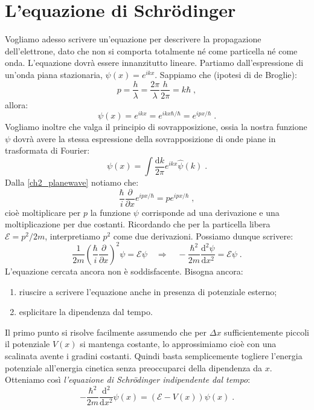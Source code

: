 \documentclass[10pt,a4paper]{report}
\theoremstyle{definition}
\newcommand{\dev}[3][]{\frac{\mathrm{d}^{#1} #2}{\mathrm{d} #3^{#1}}}
\numberwithin{equation}{section}
\newcommand{\diff}[1][]{\mathrm{d}#1}
\begin{document}
\section{L'equazione di Schrödinger}
Vogliamo adesso scrivere un'equazione per descrivere la propagazione dell'elettrone, dato che non si comporta totalmente né come particella né come onda. L'equazione dovrà essere innanzitutto lineare. Partiamo dall'espressione di un'onda piana stazionaria, $\psi(x)=e^{ikx}$. Sappiamo che (ipotesi di de Broglie):
$$
p=\frac{h}{\lambda}=\frac{2\pi}{\lambda}\frac{h}{2\pi}=k\hbar\;,
$$
allora:
\begin{equation}
\psi(x)=e^{ikx}=e^{ikx\hbar/\hbar}=e^{ipx/\hbar}\;. \label{ch2_planewave}
\end{equation}
Vogliamo inoltre che valga il principio di sovrapposizione, ossia la nostra funzione $\psi$ dovrà avere la stessa espressione della sovrapposizione di onde piane in trasformata di Fourier:
\begin{equation}
\psi(x)=\int \frac{\diff{k}}{2\pi}e^{ikx}\hat{\psi}(k)\;.
\end{equation}
Dalla \eqref{ch2_planewave} notiamo che:
$$
\frac{\hbar}{i}\frac{\partial}{\partial x}e^{ipx/\hbar}=pe^{ipx/\hbar}\;,
$$
cioè moltiplicare per $p$ la funzione $\psi$ corrisponde ad una derivazione e una moltiplicazione per due costanti. Ricordando che per la particella libera $\mathcal{E}=p^2/2m$, interpretiamo $p^2$ come due derivazioni. Possiamo dunque scrivere:
\begin{equation}
\frac{1}{2m}\left(\frac{\hbar}{i}\frac{\partial}{\partial x}\right)^2\psi=\mathcal{E}\psi\quad  \Longrightarrow\quad -\frac{\hbar^2}{2m}\dev[2]{\psi}{x}=\mathcal{E}\psi\;.
\end{equation}
L'equazione cercata ancora non è soddisfacente. Bisogna ancora:
\begin{enumerate}
\item riuscire a scrivere l'equazione anche in presenza di potenziale esterno;
\item esplicitare la dipendenza dal tempo.
\end{enumerate}
Il primo punto si risolve facilmente assumendo che per $\Delta x$ sufficientemente piccoli il potenziale $V(x)$ si mantenga costante, lo approssimiamo cioè con una scalinata avente i gradini costanti. Quindi basta semplicemente togliere l'energia potenziale all'energia cinetica senza preoccuparci della dipendenza da $x$. Otteniamo così \textit{l'equazione di Schrödinger indipendente dal tempo}:
\begin{equation}
-\frac{\hbar^2}{2m}\frac{\mathrm{d}^2}{\diff{x}^2}\psi(x)= (\mathcal{E}-V(x))\psi(x)\;. \label{ch2_schrotimeindip}
\end{equation}
\end{document}
